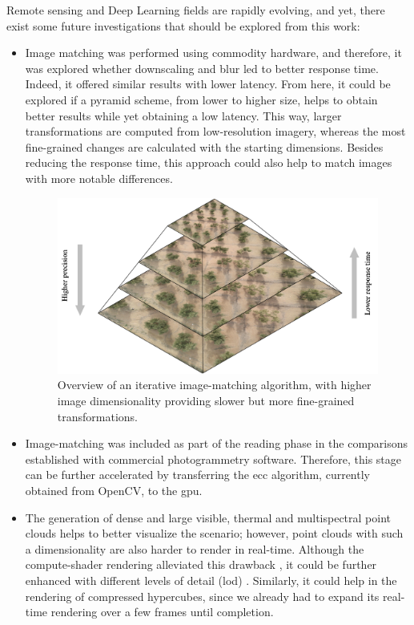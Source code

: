 Remote sensing and Deep Learning fields are rapidly evolving, and yet, there exist some future investigations that should be explored from this work:
\begin{itemize}
    \item Image matching was performed using commodity hardware, and therefore, it was explored whether downscaling and blur led to better response time. Indeed, it offered similar results with lower latency. From here, it could be explored if a pyramid scheme, from lower to higher size, helps to obtain better results while yet obtaining a low latency. This way, larger transformations are computed from low-resolution imagery, whereas the most fine-grained changes are calculated with the starting dimensions. Besides reducing the response time, this approach could also help to match images with more notable differences.
    \begin{figure}
        \centering
        \includegraphics[width=\linewidth]{figs/conclusions/image_pyramid.png}
        \caption{Overview of an iterative image-matching algorithm, with higher image dimensionality providing slower but more fine-grained transformations.}
        \label{fig:image_pyramid}
    \end{figure}
    \item Image-matching was included as part of the reading phase in the comparisons established with commercial photogrammetry software. Therefore, this stage can be further accelerated by transferring the \acrshort{ecc} algorithm, currently obtained from OpenCV, to the \acrshort{gpu}.
    \item The generation of dense and large visible, thermal and multispectral point clouds helps to better visualize the scenario; however, point clouds with such a dimensionality are also harder to render in real-time. Although the compute-shader rendering alleviated this drawback \cite{schutz_rendering_2021}, it could be further enhanced with different levels of detail (\acrshort{lod}) \cite{schutz_gpu-accelerated_2023}. Similarly, it could help in the rendering of compressed hypercubes, since we already had to expand its real-time rendering over a few frames until completion.

\end{itemize}
